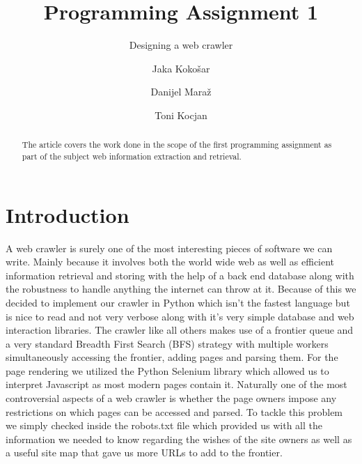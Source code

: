 \documentclass[runningheads]{llncs}
\begin{document}
\title{Programming Assignment 1}
\subtitle{Designing a web crawler}

\author{
  Jaka Kokošar
  \and
  Danijel Maraž
  \and
  Toni Kocjan
}



\maketitle             

\begin{abstract}
The article covers the work done in the scope of the first programming assignment as part of the subject web information extraction and retrieval. 

\end{abstract}

\section{Introduction}
A web crawler is surely one of the most interesting pieces of software we can write. Mainly because it involves both the world wide web as well as efficient information retrieval and storing with the help of a back end database along with the robustness to handle anything the internet can throw at it. Because of this we decided to implement our crawler in Python which isn't the fastest language but is nice to read and not very verbose along with it's very simple database and web interaction libraries. The crawler like all others makes use of a frontier queue and a very standard Breadth First Search (BFS) strategy with multiple workers simultaneously accessing the frontier, adding pages and parsing them. For the page rendering we utilized the Python Selenium library which allowed us to interpret Javascript as most modern pages contain it. Naturally one of the most controversial aspects of a web crawler is whether the page owners impose any restrictions on which pages can be accessed and parsed. To tackle this problem we simply checked inside the robots.txt file which provided us with all the information we needed to know regarding the wishes of the site owners as well as a useful site map that gave us more URLs to add to the frontier.
\end{document}
